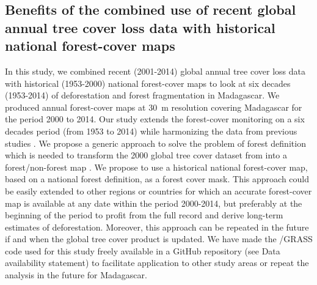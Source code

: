 \documentclass[essd, classical]{copernicus}
\newcommand{\R}{\textnormal{\sffamily{\bfseries{R}}}}
\begin{document}
\subsection{Benefits of the combined use of recent global annual
  tree cover loss data with historical national forest-cover maps}

In this study, we combined recent (2001-2014) global annual tree cover
loss data \citep{Hansen2013} with historical (1953-2000) national
forest-cover maps \citep{Harper2007} to look at six decades
(1953-2014) of deforestation and forest fragmentation in
Madagascar. We produced annual forest-cover maps at 30~m resolution
covering Madagascar for the period 2000 to 2014. Our study extends the
forest-cover monitoring on a six decades period (from 1953 to 2014)
while harmonizing the data from previous studies \citep{Harper2007,
  MEFT2009, ONE2015}. We propose a generic approach to solve the
problem of forest definition which is needed to transform the 2000
global tree cover dataset from \citet{Hansen2013} into a
forest/non-forest map \citep{Tropek2014}. We propose to use a
historical national forest-cover map, based on a national forest
definition, as a forest cover mask. This approach could be easily
extended to other regions or countries for which an accurate
forest-cover map is available at any date within the period 2000-2014,
but preferably at the beginning of the period to profit from the full
record and derive long-term estimates of deforestation. Moreover, this
approach can be repeated in the future if and when the global tree
cover product is updated. We have made the \R{}/GRASS code used for this
study freely available in a GitHub repository (see Data availability
statement) to facilitate application to other study areas or repeat
the analysis in the future for Madagascar.
\end{document}
